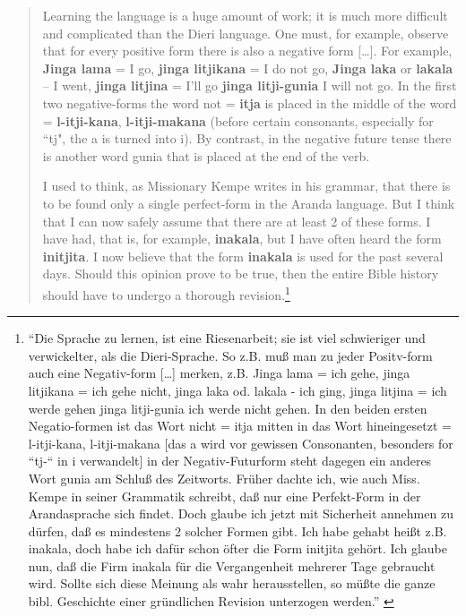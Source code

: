 \begin{quote}
	Learning the language is a huge amount of work; it is much more difficult and complicated than the Dieri language. One must, for example, observe that for every positive form there is also a negative form […]. For example, \textbf{Jinga lama} = I go, \textbf{jinga litjikana} = I do not go, \textbf{Jinga laka} or \textbf{lakala} – I went, \textbf{jinga litjina} = I'll go \textbf{jinga litji-gunia} I will not go. In the first two negative-forms the word not = \textbf{itja} is placed in the middle of the word = \textbf{l-itji-kana}, \textbf{l-itji-makana} (before certain consonants, especially for “tj", the a is turned into i). By contrast, in the negative future tense there is another word gunia that is placed at the end of the verb.
	
	I used to think, as Missionary Kempe writes in his grammar, that there is to be found only a single perfect-form in the Aranda language. But I think that I can now safely assume that there are at least 2 of these forms. I have had, that is, for example, \textbf{inakala}, but I have often heard the form \textbf{initjita}. I now believe that the form \textbf{inakala} is used for the past several days. Should this opinion prove to be true, then the entire Bible history should have to undergo a thorough revision.\footnote{“Die Sprache zu lernen, ist eine Riesenarbeit; sie ist viel schwieriger und verwickelter, als die Dieri-Sprache. So z.B. muß man zu jeder Positv-form auch eine Negativ-form […] merken, z.B. Jinga lama = ich gehe, jinga litjikana = ich gehe nicht, jinga laka od. lakala - ich ging, jinga litjina = ich werde gehen jinga litji-gunia ich werde nicht gehen. In den beiden ersten Negatio-formen ist das Wort nicht = itja mitten in das Wort hineingesetzt = l-itji-kana, l-itji-makana [das a wird vor gewissen Consonanten, besonders for “tj-“ in i verwandelt] in der Negativ-Futurform steht dagegen ein anderes Wort gunia am Schluß des Zeitworts. Früher dachte ich, wie auch Miss. Kempe in seiner Grammatik schreibt, daß nur eine Perfekt-Form in der Arandasprache sich findet. Doch glaube ich jetzt mit Sicherheit annehmen zu dürfen, daß es mindestens 2 solcher Formen gibt. Ich habe gehabt heißt z.B. inakala, doch habe ich dafür schon öfter die Form initjita gehört. Ich glaube nun, daß die Firm inakala für die Vergangenheit mehrerer Tage gebraucht wird. Sollte sich diese Meinung als wahr herausstellen, so müßte die ganze bibl. Geschichte einer gründlichen Revision unterzogen werden.” \citep{strehlow_letter_1896}}
\end{quote}

